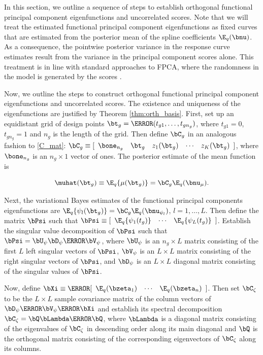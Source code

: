 \documentclass[ba]{imsart}
\numberwithin{equation}{section}
\theoremstyle{plain}
\def\numu{\bnu_\mu}
\newcommand\nupsi[1]{\bnu_{\psi_{#1}}}
\begin{document}
In this section, we outline a sequence of steps to establish orthogonal
functional principal component eigenfunctions and uncorrelated scores.
Note that we will treat the estimated functional principal component eigenfunctions as fixed curves that
are estimated from the posterior mean of the spline coefficients $\E_q (\bnu)$. As a consequence, the pointwise
posterior variance in the response curve estimates result from the variance in the principal component scores
alone. This treatment is in line with standard approaches to FPCA, where the randomness in the model is
generated by the scores  \citep[e.g.][]{yao05, benko09}.

Now, we outline the steps to construct orthogonal functional principal component eigenfunctions and
uncorrelated scores. The existence and uniqueness of the eigenfunctions are justified by Theorem \ref{thm:orth_basis}.
First, set up an equidistant grid of design points $\bt_g = \T{(t_{g1}, \dots, t_{gn_g})}$,
where $t_{g1} = 0$, $t_{gn_g} = 1$ and $n_g$ is the length of the grid. Then define $\bC_g$ in an analogous fashion
to \eqref{C_mat}: $\bC_g \equiv [ \begin{array}{ccccc} \bone_{n_g} & \bt_g & z_1 (\bt_g) & \cdots & z_K (\bt_g)
\end{array}]$, where $\bone_{n_g}$ is an $n_g \times 1$ vector of ones. The posterior estimate of the mean
function is

\begin{equation}
	\muhat (\bt_g) \equiv \E_q \{ \mu (\bt_g) \} = \bC_g \E_q (\numu).
\label{mu_hat}
\end{equation}

\noindent Next, the variational Bayes estimates of the
functional principal components eigenfunctions are
$\E_q \{ \psi_l (\bt_g) \} = \bC_g \E_q (\nupsi{l})$,
$l = 1, \dots, L$. Then define the matrix $\bPsi$ such that
$\bPsi \equiv [\begin{array}{ccc} \E_q \{ \psi_1 (t_g) \} & \cdots & \E_q \{ \psi_L (t_g) \} \end{array}]$.
Establish the singular value decomposition of $\bPsi$ such that $\bPsi = \bU_\psi \bD_\psi \T{\bV}_\psi$,
where $\bU_\psi$ is an $n_g \times L$ matrix consisting of the first $L$ left singular vectors of $\bPsi$,
$\bV_\psi$ is an $L \times L$ matrix consisting of the right singular vectors of $\bPsi$, and
$\bD_\psi$ is an $L \times L$ diagonal matrix consisting of the singular values of $\bPsi$.

Now, define $\bXi \equiv \T{[\begin{array}{ccc} \E_q (\bzeta_1) & \cdots & \E_q (\bzeta_n) \end{array}]}$.
Then set $\bC_\zeta$ to be the $L \times L$ sample covariance matrix of the
column vectors of $\bD_\psi \T{\bV}_\psi \T{\bXi}$ and establish its spectral decomposition
$\bC_\zeta = \bQ \bLambda \T{\bQ}$, where
$\bLambda$ is a diagonal matrix consisting of the eigenvalues of $\bC_\zeta$ in descending order along its
main diagonal and $\bQ$ is the orthogonal matrix consisting of the corresponding eigenvectors of $\bC_\zeta$ along
its columns.
\end{document}
